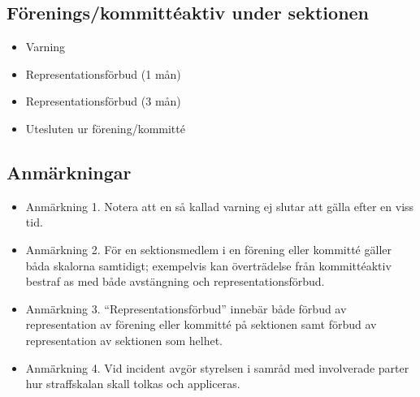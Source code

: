 \documentclass[11pt, includeaddress]{classes/cthit}
\begin{document}
\subsection{Förenings/kommittéaktiv under sektionen}
\begin{itemize}
	\item Varning
	\item Representationsförbud (1 mån)
 	\item Representationsförbud (3 mån)
	\item Utesluten ur förening/kommitté
\end{itemize}

\subsection{Anmärkningar}
\begin{itemize}
	\item Anmärkning 1. Notera att en så kallad varning ej slutar att gälla efter en viss tid.
	\item Anmärkning 2. För en sektionsmedlem i en förening eller kommitté gäller båda skalorna samtidigt; exempelvis kan överträdelse från kommittéaktiv bestraf as med både avstängning och representationsförbud.
 	\item Anmärkning 3. “Representationsförbud” innebär både förbud av representation av förening eller kommitté på sektionen samt förbud av representation av sektionen som helhet.
	\item Anmärkning 4. Vid incident avgör styrelsen i samråd med involverade parter hur straffskalan skall tolkas och appliceras.
\end{itemize}
\end{document}
